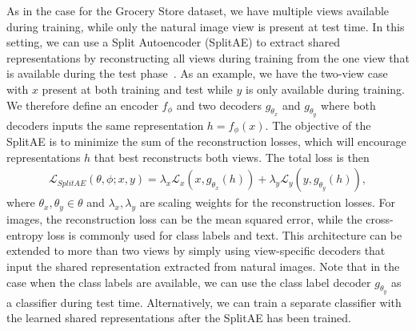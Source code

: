 As in the case for the Grocery Store dataset, we have multiple views available during training, while only the natural image view is present at test time. In this setting, we can use a Split Autoencoder (SplitAE) to extract shared representations by reconstructing all views during training from the one view that is available during the test phase~. As an example, we have the two-view case with $x$ present at both training and test while $y$ is only available during training. We therefore define an encoder $f_{\phi}$ and two decoders $g_{\theta_{x}}$ and $g_{\theta_{y}}$ where both decoders inputs the same representation $h = f_{\phi}(x)$. The objective of the SplitAE is to minimize the sum of the reconstruction losses, which will encourage representations $h$ that best reconstructs both views. The total loss is then 
\begin{align}\label{eq:splitae_objective}
    \mathcal{L}_{SplitAE}(\theta, \phi; x, y) = \lambda_{x} \mathcal{L}_{x}(x, g_{\theta_{x}}(h)) + \lambda_{y} \mathcal{L}_{y}(y, g_{\theta_{y}}(h)) ,
\end{align}
where $\theta_{x}, \theta_{y} \in \theta$ and $\lambda_{x}, \lambda_{y}$ are scaling weights for the reconstruction losses.
For images, the reconstruction loss can be the mean squared error, while the cross-entropy loss is commonly used for class labels and text. This architecture can be extended to more than two views by simply using view-specific decoders that input the shared representation extracted from natural images. Note that in the case when the class labels are available, we can use the class label decoder $g_{\theta_{y}}$ as a classifier during test time. Alternatively, we can train a separate classifier with the learned shared representations after the SplitAE has been trained.


